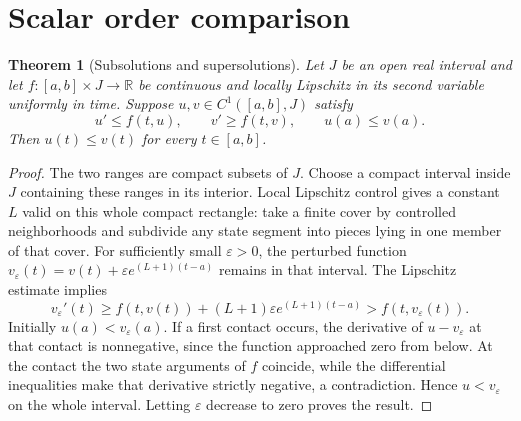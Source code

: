 \documentclass[11pt,oneside]{book}
\newtheorem{theorem}{Theorem}[chapter]
\theoremstyle{definition}
\theoremstyle{remark}\newtheorem{remark}[theorem]{Remark}
\newcommand{\R}{\mathbb R}\newcommand{\C}{\mathbb C}
\begin{document}
\section{Scalar order comparison}
\begin{theorem}[Subsolutions and supersolutions]\label{d13:05:comparison}
Let $J$ be an open real interval and let $f:[a,b]\times J\to\R$ be
continuous and locally Lipschitz in its second variable uniformly in
time. Suppose $u,v\in C^1([a,b],J)$ satisfy
\[
 u'\leq f(t,u),\qquad v'\geq f(t,v),\qquad u(a)\leq v(a).
\]
Then $u(t)\leq v(t)$ for every $t\in[a,b]$.
\end{theorem}
\begin{proof}
The two ranges are compact subsets of $J$. Choose a compact interval
inside $J$ containing these ranges in its interior. Local Lipschitz
control gives a constant $L$ valid on this whole compact rectangle:
take a finite cover by controlled neighborhoods and subdivide any
state segment into pieces lying in one member of that cover.
For sufficiently small $\varepsilon>0$, the perturbed function
$v_\varepsilon(t)=v(t)+\varepsilon e^{(L+1)(t-a)}$ remains in that
interval. The Lipschitz estimate implies
\[
 v_\varepsilon'(t)\geq f(t,v(t))+
       (L+1)\varepsilon e^{(L+1)(t-a)}
       >f(t,v_\varepsilon(t)).
\]
Initially $u(a)<v_\varepsilon(a)$. If a first contact occurs, the
derivative of $u-v_\varepsilon$ at that contact is nonnegative, since
the function approached zero from below. At the contact the two state
arguments of $f$ coincide, while the differential inequalities make
that derivative strictly negative, a contradiction. Hence
$u<v_\varepsilon$ on the whole interval. Letting $\varepsilon$
decrease to zero proves the result.
\end{proof}
\end{document}
